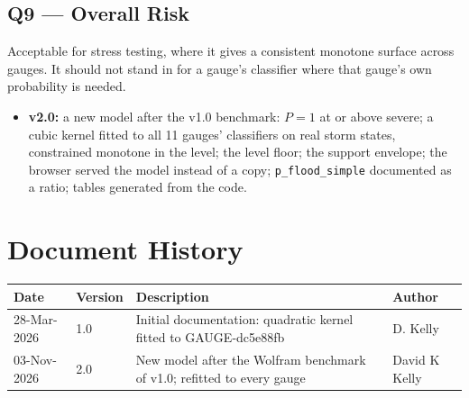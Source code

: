 \documentclass[11pt,a4paper]{article}
\renewcommand{\mkmhistorypage}[1]{%
    \section{Document History}
    \begin{table}[ht]
        \centering
        \begin{tabular}{l|l|p{9cm}|l}
            \textbf{Date} & \textbf{Version} & \textbf{Description} & \textbf{Author} \\
            \hline
            #1
        \end{tabular}
    \end{table}
}
\begin{document}
\subsection{Q9 --- Overall Risk}
Acceptable for stress testing, where it gives a consistent monotone surface across
gauges. It should not stand in for a gauge's classifier where that gauge's own
probability is needed.

\mkmchangelog

\begin{itemize}[nosep]
    \item \textbf{v2.0:} a new model after the v1.0 benchmark: $P=1$ at or above
          severe; a cubic kernel fitted to all 11 gauges' classifiers on real storm
          states, constrained monotone in the level; the level floor; the support
          envelope; the browser served the model instead of a copy;
          \texttt{p\_flood\_simple} documented as a ratio; tables generated from the
          code.
\end{itemize}

\mkmhistorypage{28-Mar-2026 & 1.0 & Initial documentation: quadratic kernel fitted to GAUGE-dc5e88fb & D. Kelly \\
03-Nov-2026 & 2.0 & New model after the Wolfram benchmark of v1.0; refitted to every gauge & David K Kelly \\}
\end{document}
